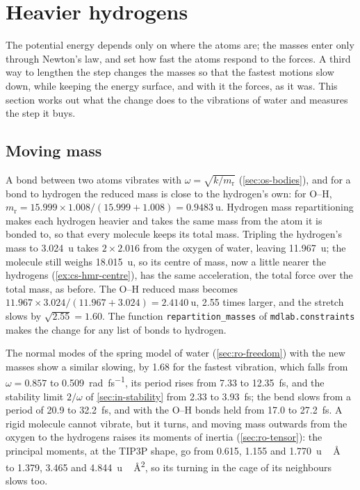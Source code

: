 \section{Heavier hydrogens}
\label{sec:cs-mass}

The potential energy depends only on where the atoms are; the masses
enter only through Newton's law, and set how fast the
atoms respond to the forces. A third way to lengthen the step changes the
masses so that the fastest motions slow down, while keeping the energy
surface, and with it the forces, as it was. This section works out what
the change does to the vibrations of water and measures the step it buys.

\subsection*{Moving mass}

A bond between two atoms vibrates with $\omega = \sqrt{k/m_{\mathrm r}}$
(\cref{sec:os-bodies}), and for a bond to hydrogen the reduced mass is
close to the hydrogen's own: for O--H, $m_{\mathrm r} = 15.999\times1.008/
(15.999 + 1.008) = \SI{0.9483}{\amu}$. Hydrogen mass repartitioning makes
each hydrogen heavier and takes the same mass from the atom it is bonded
to, so that every molecule keeps its total mass. Tripling the hydrogen's
mass to \SI{3.024}{\amu} takes $2\times2.016$ from the oxygen of water,
leaving \SI{11.967}{\amu}; the molecule still weighs \SI{18.015}{\amu}, so
its centre of mass, now a little nearer the hydrogens
(\cref{ex:cs-hmr-centre}), has the same acceleration, the total force
over the total mass, as before. The O--H reduced mass becomes
$11.967\times3.024/(11.967 + 3.024) = \SI{2.4140}{\amu}$, 2.55 times
larger, and the stretch slows by $\sqrt{2.55} = 1.60$. The function
\texttt{repartition\_masses} of \texttt{mdlab.constraints} makes the
change for any list of bonds to hydrogen.

The normal modes of the spring model of water (\cref{sec:ro-freedom})
with the new masses show a similar slowing, by 1.68 for the fastest
vibration, which falls from
$\omega = 0.857$ to \SI{0.509}{\radian\per\femto\second}, its period rises
from 7.33 to \SI{12.35}{\femto\second}, and the stability limit $2/\omega$
of \cref{sec:in-stability} from 2.33 to \SI{3.93}{\femto\second}; the bend
slows from a period of 20.9 to \SI{32.2}{\femto\second}, and with the O--H
bonds held from 17.0 to \SI{27.2}{\femto\second}. A rigid molecule
cannot vibrate, but it turns, and moving mass outwards from the oxygen to
the hydrogens raises its moments of inertia (\cref{sec:ro-tensor}): the
principal moments, at the TIP3P shape, go from 0.615, 1.155 and \SI{1.770}{\amu\,\angstrom
\squared} to 1.379, 3.465 and \SI{4.844}{\amu\,\angstrom\squared}, so its
turning in the cage of its neighbours slows too.

